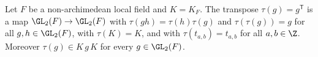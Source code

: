 Let $F$ be a non-archimedean local field and $K=K_F$. The transpose $\tau(g)=g^{\mathsf T}$ is a map
$\GL_2(F)\to\GL_2(F)$ with $\tau(gh)=\tau(h)\tau(g)$ and $\tau(\tau(g))=g$ for all $g,h\in\GL_2(F)$, with
$\tau(K)=K$, and with $\tau(t_{a,b})=t_{a,b}$ for all $a,b\in\Z$. Moreover $\tau(g)\in K\,g\,K$ for every
$g\in\GL_2(F)$.
